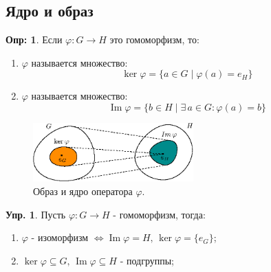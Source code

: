 \documentclass[12pt]{article}
\theoremstyle{definition}
\newtheorem{defn}{Опр:}
\newtheorem{exrc}{Упр.}
\DeclareMathOperator{\Ima}{Im}
\begin{document}
\subsection*{Ядро и образ}
\begin{defn}
	Если $\varphi \colon G \to H$ это гомоморфизм, то:
	\begin{enumerate}[label=\arabic*)]
		\item {} $\varphi$ называется множество: 
		$$
			\ker\varphi = \{a \in G \mid \varphi(a) = e_H\}
		$$
		\item {} $\varphi$ называется множество: 
		$$
			\Ima\varphi = \{b \in H \mid \exists \, a \in G \colon \varphi(a) = b\}
		$$
	\end{enumerate}
\end{defn}
\begin{figure}[H]
	\centering
	\includegraphics[width=0.55\textwidth]{AL1L24_1.eps}
	\caption{Образ и ядро оператора $\varphi$.}
	\label{24_1}
\end{figure}
\begin{exrc}
	Пусть $\varphi \colon G \to H$ - гомоморфизм, тогда:
	\begin{enumerate}[label=\arabic*)]
		\item $\varphi$ - изоморфизм $\Leftrightarrow \Ima\varphi = H, \, \ker\varphi = \{e_G\}$;
		\item $\ker\varphi \subseteq G, \, \Ima \varphi \subseteq H$ - подгруппы;
	\end{enumerate}
\end{exrc}
\end{document}
